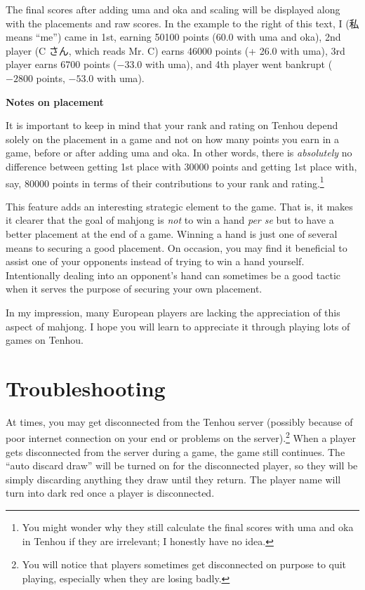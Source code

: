 \bigskip

The final scores after adding {\jap uma} and {\jap oka} and scaling will be displayed along with the placements and raw scores. In the example to the right of this text, I (私 means ``me'') came in 1st, earning 50100 points (60.0 with {\jap uma} and {\jap oka}), 2nd player (C さん, which reads Mr. C) earns 46000 points (+ 26.0 with {\jap uma}), 3rd player earns 6700 points ($-33.0$ with {\jap uma}), and 4th player went bankrupt ($-2800$ points, $-53.0$ with {\jap uma}). 

\newpage

\begin{boxnote} \small
{\bf\normalsize Notes on placement}

\bigskip
It is important to keep in mind that your rank and rating on {\jap Tenhou} depend solely on the placement in a game and not on how many points you earn in a game, before or after adding {\jap uma} and {\jap oka}. In other words, there is \emph{absolutely} no difference between getting 1st place with 30000 points and getting 1st place with, say, 80000 points in terms of their contributions to your rank and rating.\footnote{You might wonder why they still calculate the final scores with {\jap uma} and {\jap oka} in {\jap Tenhou} if they are irrelevant; I honestly have no idea.}

\bigskip
This feature adds an interesting strategic element to the game. That is, it makes it clearer that the goal of mahjong is \emph{not} to win a hand \emph{per se} but to have a better placement at the end of a game. Winning a hand is just one of several means to securing a good placement. On occasion, you may find it beneficial to assist one of your opponents instead of trying to win a hand yourself. Intentionally dealing into an opponent's hand can sometimes be a good tactic when it serves the purpose of securing your own placement. 

\bigskip
In my impression, many European players are lacking the appreciation of this aspect of mahjong. I hope you will learn to appreciate it through playing lots of games on {\jap Tenhou}.
\vspace{5pt}
\end{boxnote}

\newpage
\section{Troubleshooting}

At times, you may get disconnected from the {\jap Tenhou} server (possibly because of poor internet connection on your end or problems on the server).\footnote{You will notice that players sometimes get disconnected on purpose to quit playing, especially when they are losing badly.}
When a player gets disconnected from the server during a game, the game still continues. The ``auto discard draw'' will be turned on for the disconnected player, so they will be simply discarding anything they draw until they return. The player name will turn into dark red once a player is disconnected. 

